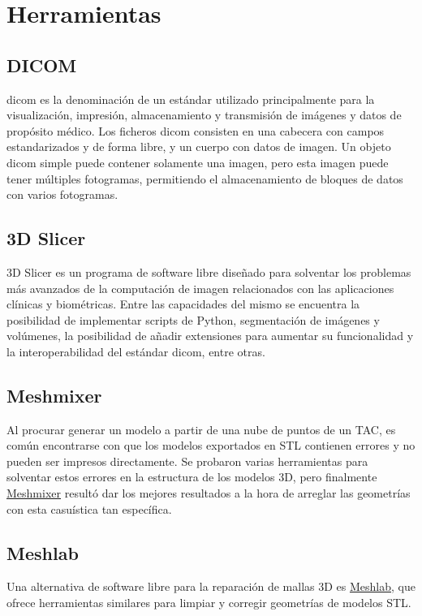 \section{Herramientas}
    \subsection{DICOM}
    \acrshort{dicom} es la denominación de un estándar utilizado principalmente para la visualización, impresión, almacenamiento y transmisión de imágenes y datos de propósito médico.
    Los ficheros \acrshort{dicom} consisten en una cabecera con campos estandarizados y de forma libre, y un cuerpo con datos de imagen. Un objeto \acrshort{dicom} simple puede contener solamente una imagen, pero esta imagen puede tener múltiples fotogramas, permitiendo el almacenamiento de bloques de datos con varios fotogramas.
   
    \subsection{3D Slicer}
3D Slicer es un programa de software libre diseñado para solventar los problemas más avanzados de la computación de imagen relacionados con las aplicaciones clínicas y biométricas. Entre las capacidades del mismo se encuentra la posibilidad de implementar scripts de Python, segmentación de imágenes y volúmenes, la posibilidad de añadir extensiones para aumentar su funcionalidad y la interoperabilidad del estándar \acrshort{dicom}, entre otras.

\subsection{Meshmixer}
Al procurar generar un modelo a partir de una nube de puntos de un TAC, es común encontrarse con que los modelos exportados en STL contienen errores y no pueden ser impresos directamente. Se probaron varias herramientas para solventar estos errores en la estructura de los modelos 3D, pero finalmente \href{https://www.meshmixer.com}{Meshmixer} resultó dar los mejores resultados a la hora de arreglar las geometrías con esta casuística tan específica.
    \subsection{Meshlab}
Una alternativa de software libre para la reparación de mallas 3D es \href{https://www.meshlab.net}{Meshlab}, que ofrece herramientas similares para limpiar y corregir geometrías de modelos STL.
